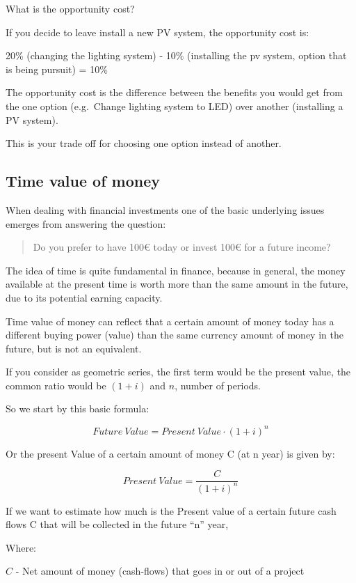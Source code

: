 \documentclass[]{book}
\newcommand{\euro}{€}
\theoremstyle{definition}
\theoremstyle{definition}
\theoremstyle{definition}
\theoremstyle{remark}
\begin{document}
What is the opportunity cost?

If you decide to leave install a new PV system, the opportunity cost is:

20\% (changing the lighting system) - 10\% (installing the pv system,
option that is being pursuit) = 10\%

The opportunity cost is the difference between the benefits you would
get from the one option (e.g.~Change lighting system to LED) over
another (installing a PV system).

This is your trade off for choosing one option instead of another.

\subsection{Time value of money}\label{time-value-of-money}

When dealing with financial investments one of the basic underlying
issues emerges from answering the question:

\begin{quote}
Do you prefer to have 100\euro{} today or invest 100\euro{} for a future
income?
\end{quote}

The idea of time is quite fundamental in finance, because in general,
the money available at the present time is worth more than the same
amount in the future, due to its potential earning capacity.

Time value of money can reflect that a certain amount of money today has
a different buying power (value) than the same currency amount of money
in the future, but is not an equivalent.

If you consider as geometric series, the first term would be the present
value, the common ratio would be \((1+i)\) and \(n\), number of periods.

So we start by this basic formula:

\[Future\ Value = Present \ Value \cdot (1+i)^n\]

Or the present Value of a certain amount of money C (at n year) is given
by:

\[Present\ Value = \frac{C}{(1+i)^n}\]

If we want to estimate how much is the Present value of a certain future
cash flows C that will be collected in the future ``n'' year,

Where:

\(C\) - Net amount of money (cash-flows) that goes in or out of a
project
\end{document}
